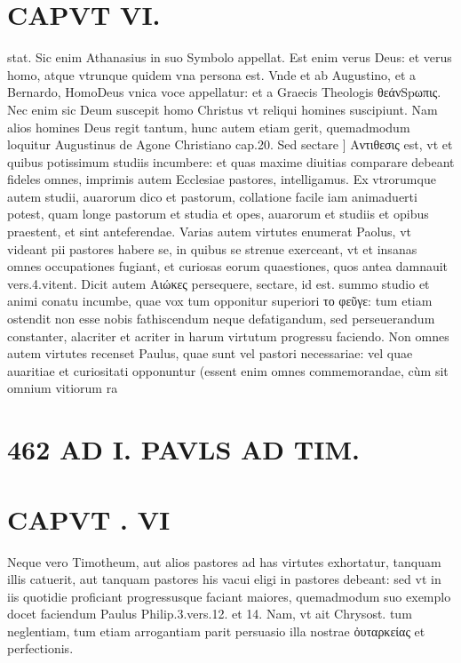 \documentclass{article}
\begin{document}
\begin{pages}
\section*{CAPVT  VI. }
\marginpar{[ p.461 ]}\pstart stat. Sic enim Athanasius in suo Symbolo appellat. Est enim verus Deus: et verus homo, atque vtrunque quidem vna persona est. Vnde et ab Augustino, et a Bernardo, HomoDeus vnica voce appellatur: et a Graecis Theologis θεάνSpωπις. Nec enim sic Deum suscepit homo Christus vt reliqui homines suscipiunt. Nam alios homines Deus regit tantum, hunc autem etiam gerit, quemadmodum loquitur Augustinus de Agone Christiano cap.20.  \pend\pstart Sed sectare ] Αντιθεσις est, vt et quibus potissimum studiis incumbere: et quas maxime diuitias comparare debeant fideles omnes, imprimis autem Ecclesiae pastores, intelligamus. Ex vtrorumque autem studii, auarorum dico et pastorum, collatione facile iam animaduerti potest, quam longe pastorum et studia et opes, auarorum et studiis et opibus praestent, et sint anteferendae. Varias autem virtutes enumerat Paolus, vt videant pii pastores habere se, in quibus se strenue exerceant, vt et insanas omnes occupationes fugiant, et curiosas eorum quaestiones, quos antea damnauit vers.4.vitent.  \pend\pstart Dicit autem Αιώκες persequere, sectare, id est. summo studio et animi conatu incumbe, quae vox tum opponitur superiori το φεῦγε: tum etiam ostendit non esse nobis fathiscendum neque defatigandum, sed perseuerandum constanter, alacriter et acriter in harum virtutum progressu faciendo. Non omnes autem virtutes recenset Paulus, quae sunt vel pastori necessariae: vel quae auaritiae et curiositati opponuntur (essent enim omnes commemorandae, cùm sit omnium vitiorum ra\pend
\section*{462 AD I. PAVLS AD TIM. }
\section*{CAPVT . VI }
\marginpar{[ p.463 ]}\pstart Neque vero Timotheum, aut alios pastores ad has virtutes exhortatur, tanquam illis catuerit, aut tanquam pastores his vacui eligi in pastores debeant: sed vt in iis quotidie proficiant progressusque faciant maiores, quemadmodum suo exemplo docet faciendum Paulus Philip.3.vers.12. et 14. Nam, vt ait Chrysost. tum neglentiam, tum etiam arrogantiam parit persuasio illa nostrae ὀυταρκείας et perfectionis.  \pend
{}
{}

\end{pages}
\end{document}

